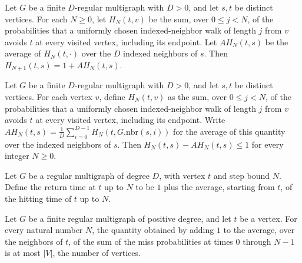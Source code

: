 \begin{theorem}
\label{Randomized.RegularMultigraph.hitTime_succ}
\leanok
{}
Let $G$ be a finite $D$-regular multigraph with $D>0$, and let $s,t$ be distinct
vertices. For each $N\ge0$, let $H_N(t,v)$ be the sum, over $0\le j<N$, of the
probabilities that a uniformly chosen indexed-neighbor walk of length $j$ from $v$
avoids $t$ at every visited vertex, including its endpoint. Let $A H_N(t,s)$ be the
average of $H_N(t,\cdot)$ over the $D$ indexed neighbors of $s$. Then $H_{N+1}(t,s)=1+A
H_N(t,s)$.
\end{theorem}

\begin{theorem}
\label{Randomized.RegularMultigraph.hitTime_sub_avg_le}
\leanok
{}
Let $G$ be a finite $D$-regular multigraph with $D>0$, and let $s,t$ be distinct
vertices. For each vertex $v$, define $H_N(t,v)$ as the sum, over $0\le j<N$, of the
probabilities that a uniformly chosen indexed-neighbor walk of length $j$ from $v$
avoids $t$ at every visited vertex, including its endpoint. Write $A
H_N(t,s)=\frac{1}{D}\sum_{i=0}^{D-1}H_N(t,G.\mathrm{nbr}(s,i))$ for the average of this
quantity over the indexed neighbors of $s$. Then $H_N(t,s)-A H_N(t,s)\le 1$ for every
integer $N\ge0$.
\end{theorem}

\begin{definition}
\label{Randomized.RegularMultigraph.returnTime}
\leanok
{}
Let $G$ be a regular multigraph of degree $D$, with vertex $t$ and step bound $N$.
Define the return time at $t$ up to $N$ to be $1$ plus the average, starting from $t$,
of the hitting time of $t$ up to $N$.
\end{definition}

\begin{theorem}
\label{Randomized.RegularMultigraph.returnTime_le_card}
\leanok
{}
Let $G$ be a finite regular multigraph of positive degree, and let $t$ be a vertex. For
every natural number $N$, the quantity obtained by adding $1$ to the average, over the
neighbors of $t$, of the sum of the miss probabilities at times $0$ through $N-1$ is at
most $|V|$, the number of vertices.
\end{theorem}

